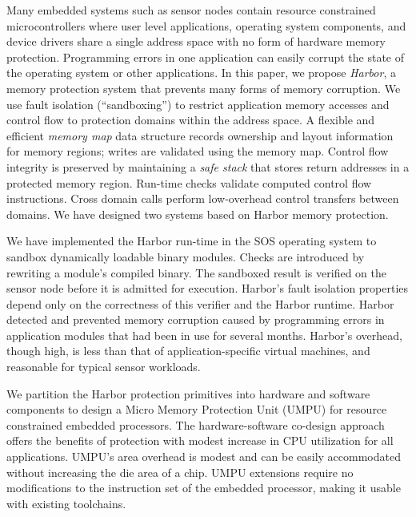 \noindent
Many embedded systems such as sensor nodes contain resource
constrained microcontrollers where user level applications, operating
system components, and device drivers share a single address space
with no form of hardware memory protection.
%
Programming errors in one application can easily corrupt the state of
the operating system or other applications.
%
In this paper, we propose \textit{Harbor}, a memory protection system that
prevents many forms of memory corruption.
%
We use fault isolation (``sandboxing'') to restrict application memory
accesses and control flow to protection domains within the address
space.
%
%
A flexible and efficient \emph{memory map} data structure records
ownership and layout information for memory regions; writes are
validated using the memory map.
%
Control flow integrity is preserved by maintaining a \emph{safe stack}
that stores return addresses in a protected memory region.
%
Run-time checks validate computed control flow instructions.
%
Cross domain calls perform low-overhead control transfers between domains.
%
We have designed two systems based on Harbor memory protection.

%
We have implemented the Harbor run-time in the SOS operating system to
sandbox dynamically loadable binary modules.
%
Checks are introduced by rewriting a module's
compiled binary. 
%
The sandboxed result is verified on the sensor node before it is admitted
for execution. 
%
Harbor's fault isolation properties depend only on the
correctness of this verifier and the Harbor runtime.
%
%
%
Harbor detected and prevented memory corruption caused by programming
errors  in application modules that had been in use for several
months.
%
Harbor's overhead, though high, is less than that of application-specific
virtual machines, and reasonable for typical sensor workloads.

We partition the Harbor protection primitives into hardware and
software components to design a Micro Memory Protection Unit (UMPU)
for resource constrained embedded processors.
%
The hardware-software co-design approach offers the benefits of
protection with modest increase in CPU utilization for all applications.
%
UMPU's area overhead is modest and can be easily accommodated without
increasing the die area of a chip.
%
UMPU extensions require no modifications to the instruction set of the embedded
processor, making it usable with existing toolchains. 

